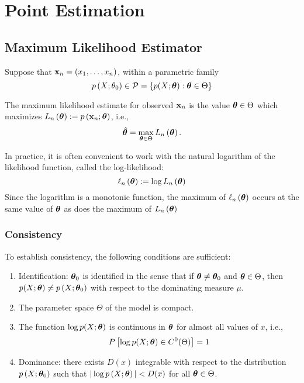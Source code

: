\chapter{Point Estimation}

\section{Maximum Likelihood Estimator}

Suppose that ${\bf x}_{n}=\left(x_{1},\ldots,x_{n}\right)$, within a parametric family
\begin{equation*}
	p\left(X;\theta_{0}\right)\in\mathcal{P}=\left\{p(X;\boldsymbol{\theta}):\boldsymbol{\theta}\in\Theta\right\}
\end{equation*}

The maximum likelihood estimate for observed ${\bf x}_{n}$ is the value $\boldsymbol{\theta}\in\Theta$ which maximizes $L_{n}\left(\boldsymbol{\theta}\right):=p\left({\bf x}_{n};\boldsymbol{\theta}\right)$, i.e.,
\begin{equation}
	\hat{\boldsymbol{\theta}}=\max_{\boldsymbol{\theta}\in\Theta}L_{n}\left(\boldsymbol{\theta}\right).
\end{equation}

In practice, it is often convenient to work with the natural logarithm of the likelihood function, called the log-likelihood:
\begin{equation*}
	\ell_{n}\left(\boldsymbol{\theta}\right):=\log L_{n}\left(\boldsymbol{\theta}\right)
\end{equation*}
Since the logarithm is a monotonic function, the maximum of $\ell_{n}\left(\boldsymbol{\theta}\right)$ occurs at the same value of $\boldsymbol{\theta}$ as does the maximum of $L_{n}\left(\boldsymbol{\theta}\right)$

\subsection{Consistency}

To establish consistency, the following conditions are sufficient:
\begin{enumerate}[label=(C\arabic*)]
	\item Identification: $\boldsymbol{\theta}_{0}$ is identified in the sense that if $\boldsymbol{\theta}\neq\boldsymbol{\theta}_{0}$ and $\boldsymbol{\theta}\in\Theta$, then $p(X;\boldsymbol{\theta})\neq p\left(X;\boldsymbol{\theta}_{0}\right)$ with respect to the dominating measure $\mu$.
	\item \label{cond:mle-compactness}
	      The parameter space $\Theta$ of the model is compact.
	\item \label{cond:mle-continuity}
	      The function $\log p(X;\boldsymbol{\theta})$ is continuous in $\boldsymbol{\theta}$ for almost all values of $x$, i.e.,
	      \begin{equation}
		      P\left[\log p(X;\boldsymbol{\theta})\in C^{0}(\Theta)\right]=1
	      \end{equation}
	\item Dominance: there exists $D(x)$ integrable with respect to the distribution $p\left(X;\boldsymbol{\theta}_{0}\right)$ such that $|\log p\left(X;\boldsymbol{\theta}\right)|<D(x)$ for all $\boldsymbol{\theta}\in\Theta$.
\end{enumerate}

